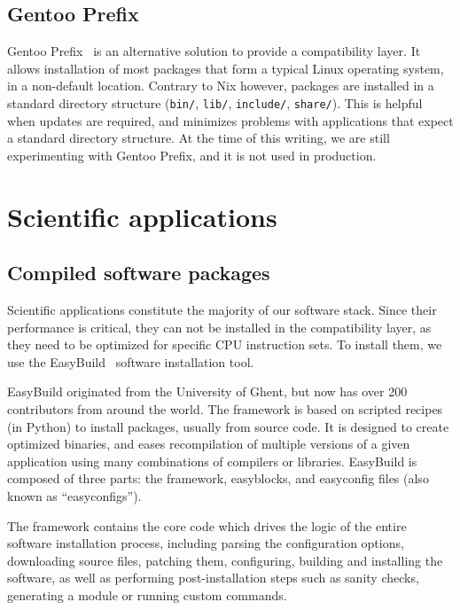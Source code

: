 \documentclass[sigconf]{acmart}
\begin{document}
\subsection{Gentoo Prefix}
\label{sub:Gentoo_Prefix}
Gentoo Prefix~\cite{Gentoo} is an alternative solution to provide a compatibility layer. It allows installation of most packages that form a typical Linux operating system, in a non-default location. Contrary to Nix however, packages are installed in a standard directory structure (\texttt{bin/}, \texttt{lib/}, \texttt{include/}, \texttt{share/}). This is helpful when updates are required, and minimizes problems with applications that expect a standard directory structure. At the time of this writing, we are still experimenting with Gentoo Prefix, and it is not used in production. 

\section{Scientific applications}
\label{sec:Scientific_applications}

\subsection{Compiled software packages}
\label{sub:Compiled_software_packages}
Scientific applications constitute the majority of our software stack. Since their performance is critical, they can not be installed in the compatibility layer, as they need to be optimized for specific CPU instruction sets. To install them, we use the EasyBuild~\cite{EasyBuild2012,EasyBuild2014,EasyBuild2016} software installation tool.

EasyBuild originated from the University of Ghent, but now has over 200 contributors from around the world. The framework is based on scripted recipes (in Python) to install packages, usually from source code. It is designed to create optimized binaries, and eases recompilation of multiple versions of a given application using many combinations of compilers or libraries. EasyBuild is composed of three parts: the framework, easyblocks, and easyconfig files (also known as ``easyconfigs''). 

The framework contains the core code which drives the logic of the entire software installation process, including parsing the configuration options, downloading source files, patching them, configuring, building and installing the software, as well as performing post-installation steps such as sanity checks, generating a module or running custom commands. 
\end{document}

